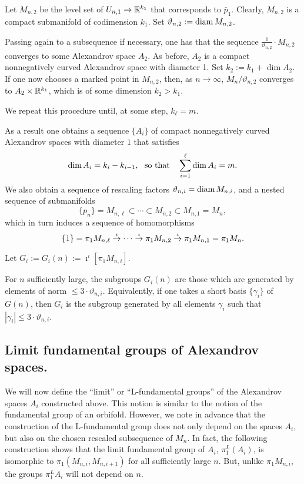 \documentclass{amsart}
\begin{document}
Let  $M_{n,2}$  be the level set of $U_{n,1}\to {\Bbb R}^{k_1}$
that corresponds to $\bar p_1$.
Clearly, $M_{n,2}$ is a compact submanifold of codimension $k_1$.
Set $\vartheta_{n,2}:=\operatorname{\rm diam} M_{n,2}$.

Passing again to a subsequence if necessary, one has
that the sequence $\frac{1}{\vartheta_{n,2}}\cdot M_{n,2}$
converges to some  Alexandrov space $A_2$.
As before, $A_2$ is a compact nonnegatively curved Alexandrov space
with diameter 1. Set $k_2:=k_1+\dim A_2$.
If one now chooses a marked point in $M_{n,2}$,
then, as $n\to\infty$,
$M_n/\vartheta_{n,2}$ converges to $A_2\times{\Bbb R}^{k_1}$,
which is of some dimension $k_2>k_1$.

We repeat this procedure until, at some step, $k_\ell=m$.

\medskip

As a result one obtains
a sequence $\{A_i\}$ of compact nonnegatively curved Alexandrov spaces
with diameter $1$ that satisfies
$$\dim A_i=k_i-k_{i-1}, \hbox{\ \ so that
\ \ }\sum_{i=1}^\ell\dim A_i=m.$$
We also obtain
a sequence of rescaling factors $\vartheta_{n,i}=\operatorname{\rm diam} M_{n,i}$,
and  a nested sequence of submanifolds
$$\{p_n\}=M_{n,\ell}\subset \cdots \subset M_{n,2}\subset M_{n,1}=M_n,$$
which in turn induces a sequence of homomorphisms
$$\{1\}=\pi_1M_{n,\ell}\buildrel {\imath}
\over \rightarrow \cdots\buildrel {\imath}
\over \rightarrow \pi_1M_{n,2}\buildrel {\imath}
\over \rightarrow \pi_1M_{n,1}=\pi_1M_n.$$


Let $G_i:=G_i(n):=\imath^i[\pi_1M_{n,i}]$.

For $n$ sufficiently large,
the subgroups $G_i(n)$ are those which are
generated by elements of  norm $\le 3\cdot \vartheta_{n,i}$.
Equivalently, if one takes a short basis $\{\gamma_i\}$ of $G(n)$,
then $G_i$ is the subgroup generated by all elements $\gamma_i$
such that $|\gamma_i|\le 3\cdot \vartheta_{n,i}$.




\subsection{ Limit fundamental groups of  Alexandrov spaces.}\label{fun-gr}

We will now define the ``limit'' or ``L-fundamental groups'' of
the Alexandrov spaces $A_i$ constructed above.
This notion is similar to the notion of  the fundamental group of an orbifold.
However, we note in advance
that the construction of the L-fundamental group does not only
depend on the spaces $A_i$,
but also on the chosen rescaled subsequence of $M_n$.
In fact, the following construction shows
that the limit fundamental group of $A_i$,
$\pi^L_1(A_i)$,
is isomorphic to $\pi_1(M_{n,i},M_{n,i+1})$
for all sufficiently large $n$.
But, unlike $\pi_1M_{n,i}$, the groups $\pi_1^LA_i$ will not depend on $n$.
\end{document}
